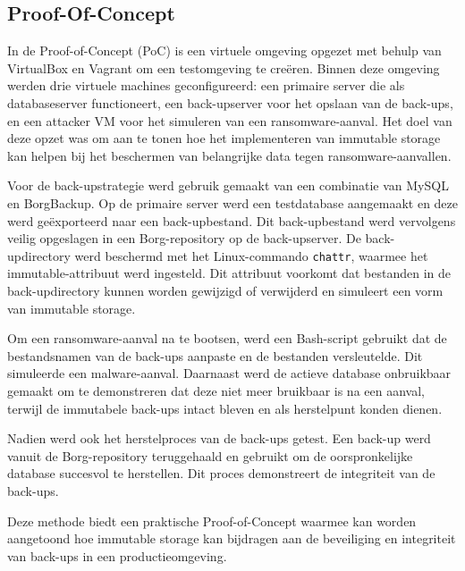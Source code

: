 \subsection{Proof-Of-Concept}
In de Proof-of-Concept (PoC) is een virtuele omgeving opgezet met behulp van VirtualBox en Vagrant om een testomgeving te creëren. Binnen deze omgeving werden drie virtuele machines geconfigureerd: een primaire server die als databaseserver functioneert, een back-upserver voor het opslaan van de back-ups, en een attacker VM voor het simuleren van een ransomware-aanval. Het doel van deze opzet was om aan te tonen hoe het implementeren van immutable storage kan helpen bij het beschermen van belangrijke data tegen ransomware-aanvallen.

Voor de back-upstrategie werd gebruik gemaakt van een combinatie van MySQL en BorgBackup. Op de primaire server werd een testdatabase aangemaakt en deze werd geëxporteerd naar een back-upbestand. Dit back-upbestand werd vervolgens veilig opgeslagen in een Borg-repository op de back-upserver. De back-updirectory werd beschermd met het Linux-commando \texttt{chattr}, waarmee het immutable-attribuut werd ingesteld. Dit attribuut voorkomt dat bestanden in de back-updirectory kunnen worden gewijzigd of verwijderd en simuleert een vorm van immutable storage.

Om een ransomware-aanval na te bootsen, werd een Bash-script gebruikt dat de bestandsnamen van de back-ups aanpaste en de bestanden versleutelde. Dit simuleerde een malware-aanval. Daarnaast werd de actieve database onbruikbaar gemaakt om te demonstreren dat deze niet meer bruikbaar is na een aanval, terwijl de immutabele back-ups intact bleven en als herstelpunt konden dienen.

Nadien werd ook het herstelproces van de back-ups getest. Een back-up werd vanuit de Borg-repository teruggehaald en gebruikt om de oorspronkelijke database succesvol te herstellen. Dit proces demonstreert de integriteit van de back-ups.

Deze methode biedt een praktische Proof-of-Concept waarmee kan worden aangetoond hoe immutable storage kan bijdragen aan de beveiliging en integriteit van back-ups in een productieomgeving.